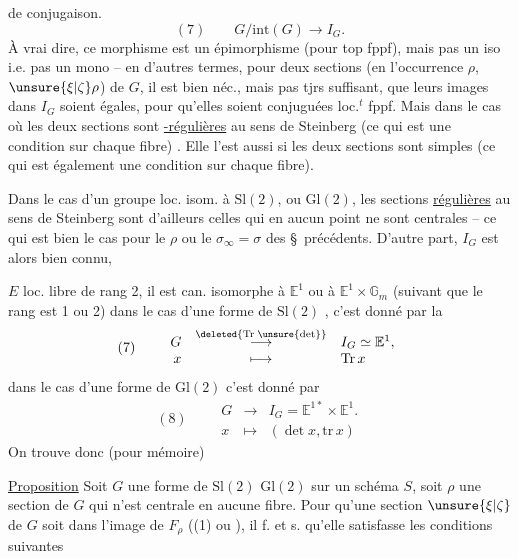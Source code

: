 de conjugaison.
\[
(7)\qquad G/\mathrm{int}(G)\longrightarrow I_G.
\]
À vrai dire,  ce morphisme est un épimorphisme (pour  top fppf), mais pas un iso i.e. pas un mono -- en d'autres termes, pour deux sections (en l'occurrence $\rho$, $\unsure{\xi|\zeta}\rho$) de $G$, il est bien néc., mais pas tjrs suffisant, que leurs images dans $I_G$ soient égales, pour qu'elles soient conjuguées loc.$^{t}$ fppf. Mais dans le cas où les deux sections sont \uline{-régulières} au sens de Steinberg (ce qui est une condition sur chaque fibre)  . Elle l'est aussi si les deux sections sont  simples (ce qui est également une condition sur chaque fibre).

Dans le cas d'un groupe loc. isom. à $\mathrm{Sl}(2)$,  ou $\mathrm{Gl}(2)$, les sections \uline{régulières} au sens de Steinberg sont d'ailleurs celles qui en aucun point ne sont centrales -- ce qui est bien le cas pour le $\rho$ ou le $\sigma_\infty=\sigma$ des \S\ précédents. D'autre part, $I_G$ est alors bien connu, 

$E$ loc. libre de rang 2, il est can. isomorphe à $\mathbb E^1$ ou à $\mathbb E^1\times\mathbb G_m$ (suivant que le rang est 1 ou 2) dans le cas d'une forme de $\mathrm{Sl}(2)$ , c'est donné par la \uline{}
\[
(7)\qquad
\begin{array}{rcl}
G&\overset{\deleted{\mathrm{Tr}\;\unsure{\det}}}{\longrightarrow}&I_G\simeq\mathbb E^1,\\
x&\longmapsto&\mathrm{Tr}\,x
\end{array}
\]
dans le cas d'une forme de $\mathrm{Gl}(2)$ c'est donné par
\[
(8)\qquad
\begin{array}{rcl}
G&\longrightarrow&I_G=\mathbb E^{1*}\times\mathbb E^1.\\
x&\longmapsto&(\det x,\mathrm{tr}\,x)
\end{array}
\]
On trouve donc (pour mémoire)

\uline{Proposition} Soit $G$ une forme de $\mathrm{Sl}(2)$  $\mathrm{Gl}(2)$ sur un schéma $S$, soit $\rho$ une section de $G$ qui n'est centrale en aucune fibre. Pour qu'une section $\unsure{\xi|\zeta}$ de $G$ soit  dans l'image de $F_\rho$ ((1) ou ), il f. et s. qu'elle satisfasse les conditions suivantes

